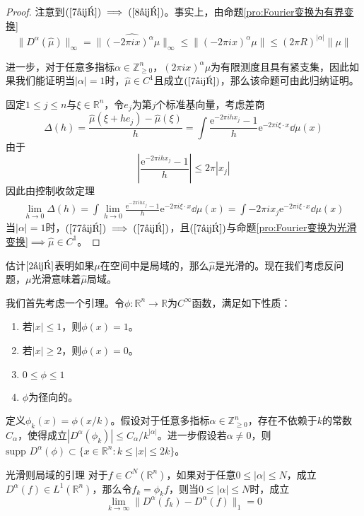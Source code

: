 \documentclass[lang = cn, %
scheme = chinese          %
]
{elegantbook}             %
\newcommand{\R}{\mathbb{R}}            %
\newcommand{\Z}{\mathbb{Z}}            %
\newcommand{\sub}{\subset}             %
\newcommand{\ee}[1]{\mathrm{e}^{#1}}           %
\newcommand{\supp}{\text{supp }}
\begin{document}
\begin{proof}
	注意到$(\ref{7式})\implies(\ref{8式})$。事实上，由命题\ref{pro:Fourier变换为有界变换}
	\[
	\|D^{\alpha}(\widehat{\mu})\|_{\infty}
	=\|\widehat{(-2\pi i x)^{\alpha}\mu}\|_{\infty}
	\le \|(-2\pi i x)^{\alpha}\mu\|
	\le (2\pi R)^{|\alpha|}\|\mu\|
	\]
	
	进一步，对于任意多指标$\alpha\in\Z_{\ge 0}^n$，$(2\pi i x)^\alpha\mu$为有限测度且具有紧支集，因此如果我们能证明当$|\alpha|=1$时，$\widehat{\mu}\in C^1$且成立$(\ref{7式})$，那么该命题可由此归纳证明。
	
	固定$1\le  j \le n$与$\xi\in\R^n$，令$e_j$为第$j$个标准基向量，考虑差商
	\[
	\Delta(h)
	=\frac{\widehat{\mu}(\xi+he_j)-\widehat{\mu}(\xi)}{h}
	=\int \frac{\ee{-2\pi i h x_j}-1}{h}\ee{-2\pi i \xi\cdot x}\dd \mu(x)
	\]
	由于
	\[
	\left| \frac{\ee{-2\pi i h x_j}-1}{h} \right|
	\le 2\pi |x_j|
	\]
	因此由控制收敛定理
	\begin{gather}
		\label{77式}
		\lim_{h\to 0}\Delta(h)
		=\int \lim_{h\to 0}\frac{\ee{-2\pi i h x_j}-1}{h}\ee{-2\pi i \xi\cdot x}\dd \mu(x)
		=\int -2\pi i x_j\ee{-2\pi i \xi\cdot x}\dd \mu(x)
	\end{gather}
	当$|\alpha|=1$时，$(\ref{77式})\implies(\ref{7式})$，且$(\ref{7式})$与命题\ref{pro:Fourier变换为光滑变换}$\implies \widehat{\mu}\in C^1$。
\end{proof}

估计$\ref{2式}$表明如果$\mu$在空间中是局域的，那么$\widehat{\mu}$是光滑的。现在我们考虑反问题，$\mu$光滑意味着$\widehat{\mu}$局域。

我们首先考虑一个引理。令$\phi:\R^n\to\R$为$C^\infty$函数，满足如下性质：
\begin{enumerate}
	\item 若$|x|\le 1$，则$\phi(x)=1$。
	\item 若$|x|\ge 2$，则$\phi(x)=0$。
	\item $0\le \phi \le 1$
	\item $\phi$为径向的。
\end{enumerate}

定义$\phi_k(x)=\phi(x/k)$。假设对于任意多指标$\alpha\in\Z_{\ge 0}^n$，存在不依赖于$k$的常数$C_\alpha$，使得成立$|D^\alpha(\phi_k)|\le C_\alpha/k^{|\alpha|}$。进一步假设若$\alpha\ne 0$，则$\supp D^\alpha(\phi)\sub \{ x\in\R^n:k\le |x|\le 2k \}$。

\begin{lemma}{}{光滑则局域的引理}
	对于$f\in C^N(\R^n)$，如果对于任意$0\le |\alpha| \le N$，成立$D^\alpha(f)\in L^1(\R^n)$，那么令$f_k=\phi_kf$，则当$0\le |\alpha| \le N$时，成立
	\[
	\lim_{k\to\infty}\|D^\alpha(f_k)-D^\alpha(f)\|_1=0
	\]
\end{lemma}
\end{document}
